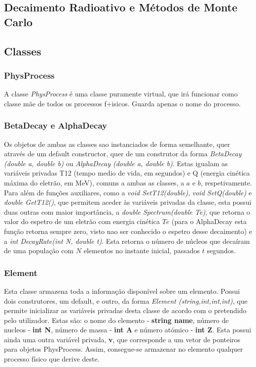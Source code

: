 \documentclass{article}
\begin{document}
\begin{multicols}{2}
  \section{Decaimento Radioativo e Métodos de Monte Carlo}
  

  \subsection{Classes}

  \subsubsection{PhysProcess}

  A classe \textit{PhysProcess} é uma classe puramente virtual, que irá funcionar como classe mãe de todos os processos f+isicos. Guarda apenas o nome do processo.

  \subsubsection{BetaDecay e AlphaDecay}

Os objetos de ambas as classes sao instanciados de forma semelhante, quer através de um default constructor, quer de um construtor da forma \textit{BetaDecay (double a, double b)} ou \textit{AlphaDecay (double a, double b)}. Estas igualam as variáveis privadas T12 (tempo medio de vida, em segundos) e Q (energia cinética máxima do eletrão, em MeV), comuns a ambas as classes, a $a$ e $b$, respetivamente.\\

Para além de funções auxiliares, como a \textit{void SetT12(double)}, \textit{void SetQ(double)} e \textit{double GetT12()}, que permitem aceder às variáveis privadas da classe, esta possui duas outras com maior importância, a \textit{double Spectrum(double Te)}, que retorna o valor do espetro de um eletrão com energia cinética $Te$ (para o AlphaDecay esta função retorna sempre zero, visto nao ser conhecido o espetro desse decaimento) e a \textit{int DecayRate(int N, double t)}. Esta retorna o número de núcleos que decaíram de uma população com $N$ elementos no instante inicial, passados $t$ segundos.


  \subsubsection{Element}

  Esta classe armazena toda a informação disponível sobre um elemento. Possui dois construtores, um default, e outro, da forma \textit{Element (string,int,int,int)}, que permite inicializar as variáveis privadas desta classe de acordo com o pretendido pelo utilizador. Estas são: o nome do elemento - \textbf{string name}, número de nucleos - \textbf{int N}, número de massa - \textbf{int A} e número atómico - \textbf{int Z}. Esta possui ainda uma outra variável privada, \textbf{v}, que corresponde a um vetor de ponteiros para objetos PhysProcess. Assim, consegue-se armazenar no elemento qualquer processo físico que derive deste.\\


\end{multicols}
\end{document}

